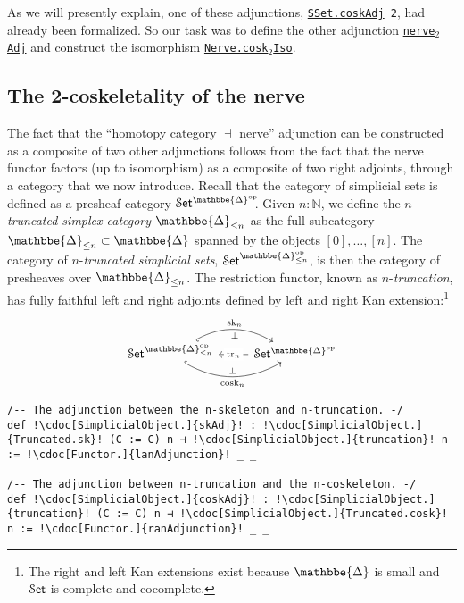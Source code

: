 \documentclass[a4paper,UKenglish,cleveref, autoref, thm-restate]{lipics-v2021}
\newcommand{\op}{\textup{op}}
\newcommand{\sk}{\textup{sk}}
\newcommand{\cosk}{\textup{cosk}}
\newcommand{\tr}{\textup{tr}}
\newcommand{\cat}[1]{\textup{\textsf{#1}}}%
\newcommand{\NN}{\mathbb{N}}
\newcommand{\1}{\mathbbe{1}}
\newcommand{\2}{\mathbbe{2}}
\newcommand{\3}{\mathbbe{3}}
\newcommand{\DDelta}{\mathbbe{\Delta}}
\newcommand{\Set}{\mathcal{S}\cat{et}}
\newcommand{\ldoc}[2][]{\href{https://leanprover-community.github.io/mathlib4_docs/find/?pattern=#1#2\#doc}{\texttt{#2}}}
\newcommand{\cdoc}[2][]{\href{https://leanprover-community.github.io/mathlib4_docs/find/?pattern=CategoryTheory.#1#2\#doc}{\texttt{#2}}}
\newcommand{\cdocTwo}[3][]{\href{https://leanprover-community.github.io/mathlib4_docs/find/?pattern=CategoryTheory.#1#2\%E2\%82\%82#3\#doc}{\texttt{#2${}_2$#3}}}
\begin{document}
As we will presently explain, one of these adjunctions, \texttt{\ldoc{SSet.coskAdj} 2}, had already been formalized. So our task was to define the other adjunction \cdocTwo{nerve}{Adj} and construct the isomorphism \cdocTwo{Nerve.cosk}{Iso}.

\subsection{The 2-coskeletality of the nerve}

The fact that the ``homotopy category $\dashv$ nerve'' adjunction can be constructed as a composite of two other adjunctions follows from the fact that the nerve functor factors (up to isomorphism) as a composite of two right adjoints, through a category that we now introduce. Recall that the category of simplicial sets is defined as a presheaf category $\Set^{\DDelta^\op}\!\!$. Given $n : \NN$, we define the $n$-\emph{truncated simplex category} $\DDelta_{\leq n}$ as the full subcategory $\DDelta_{\leq n} \subset \DDelta$ spanned by the objects $[0], \ldots, [n]$. The category of $n$-\emph{truncated simplicial sets}, $\Set^{\DDelta_{\leq n}^\op}$, is then the category of presheaves over $\DDelta_{\leq n}$. The restriction functor, known as $n$-\emph{truncation}, has fully faithful left and right adjoints defined by left and right Kan extension:\footnote{The right and left Kan extensions exist because $\DDelta$ is small and $\Set$ is complete and cocomplete.}
\[ \begin{tikzcd} \Set^{\DDelta_{\leq n}^\op}\arrow[r, bend left, hook', "\sk_n", "\bot"']\arrow[from=r, "\tr_n" description]  \arrow[r, bend right, hook, "\cosk_n"', "\bot"]& \Set^{\DDelta^\op}  \end{tikzcd}\]
\begin{lstlisting}
/-- The adjunction between the n-skeleton and n-truncation. -/
def !\cdoc[SimplicialObject.]{skAdj}! : !\cdoc[SimplicialObject.]{Truncated.sk}! (C := C) n ⊣ !\cdoc[SimplicialObject.]{truncation}! n := !\cdoc[Functor.]{lanAdjunction}! _ _

/-- The adjunction between n-truncation and the n-coskeleton. -/
def !\cdoc[SimplicialObject.]{coskAdj}! : !\cdoc[SimplicialObject.]{truncation}! (C := C) n ⊣ !\cdoc[SimplicialObject.]{Truncated.cosk}! n := !\cdoc[Functor.]{ranAdjunction}! _ _
\end{lstlisting}
\end{document}
